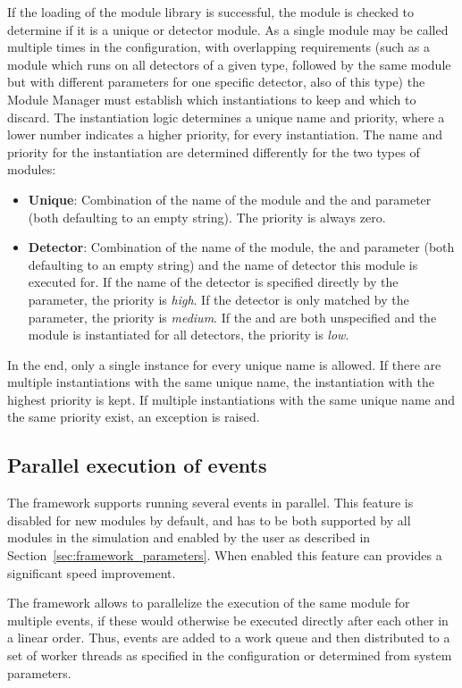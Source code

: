 If the loading of the module library is successful, the module is checked to determine if it is a unique or detector module.
As a single module may be called multiple times in the configuration, with overlapping requirements (such as a module which runs on all detectors of a given type, followed by the same module but with different parameters for one specific detector, also of this type) the Module Manager must establish which instantiations to keep and which to discard.
The instantiation logic determines a unique name and priority, where a lower number indicates a higher priority, for every instantiation.
The name and priority for the instantiation are determined differently for the two types of modules:
\begin{itemize}
\item \textbf{Unique}: Combination of the name of the module and the  and  parameter (both defaulting to an empty string).
The priority is always zero.
\item \textbf{Detector}: Combination of the name of the module, the  and  parameter (both defaulting to an empty string) and the name of detector this module is executed for.
If the name of the detector is specified directly by the  parameter, the priority is \emph{high}.
If the detector is only matched by the  parameter, the priority is \emph{medium}.
If the  and  are both unspecified and the module is instantiated for all detectors, the priority is \emph{low}.
\end{itemize}
In the end, only a single instance for every unique name is allowed.
If there are multiple instantiations with the same unique name, the instantiation with the highest priority is kept.
If multiple instantiations with the same unique name and the same priority exist, an exception is raised.

\subsection{Parallel execution of events}
\label{sec:multithreading}
The framework supports running several events in parallel.
This feature is disabled for new modules by default, and has to be both supported by all modules in the simulation and enabled by the user as described in Section~\ref{sec:framework_parameters}.
When enabled this feature can provides a significant speed improvement.

The framework allows to parallelize the execution of the same module for multiple events, if these would otherwise be executed directly after each other in a linear order.
Thus, events are added to a work queue and then distributed to a set of worker threads as specified in the configuration or determined from system parameters.


